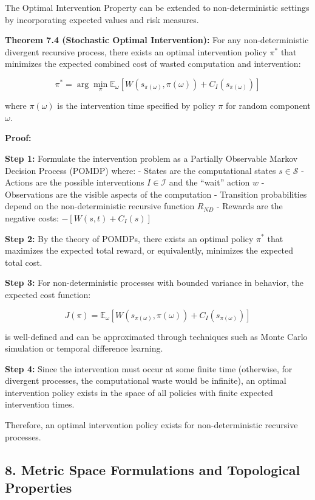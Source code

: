 \documentclass[
]{article}
\begin{document}
The Optimal Intervention Property can be extended to non-deterministic
settings by incorporating expected values and risk measures.

\textbf{Theorem 7.4 (Stochastic Optimal Intervention):} For any
non-deterministic divergent recursive process, there exists an optimal
intervention policy \(\pi^*\) that minimizes the expected combined cost
of wasted computation and intervention:

\[\pi^* = \arg\min_{\pi} \mathbb{E}_{\omega}[W(s_{\pi(\omega)}, \pi(\omega)) + C_I(s_{\pi(\omega)})]\]

where \(\pi(\omega)\) is the intervention time specified by policy
\(\pi\) for random component \(\omega\).

\textbf{Proof:}

\textbf{Step 1:} Formulate the intervention problem as a Partially
Observable Markov Decision Process (POMDP) where: - States are the
computational states \(s \in \mathcal{S}\) - Actions are the possible
interventions \(I \in \mathcal{I}\) and the ``wait'' action \(w\) -
Observations are the visible aspects of the computation - Transition
probabilities depend on the non-deterministic recursive function
\(R_{ND}\) - Rewards are the negative costs: \(-[W(s, t) + C_I(s)]\)

\textbf{Step 2:} By the theory of POMDPs, there exists an optimal policy
\(\pi^*\) that maximizes the expected total reward, or equivalently,
minimizes the expected total cost.

\textbf{Step 3:} For non-deterministic processes with bounded variance
in behavior, the expected cost function:

\[J(\pi) = \mathbb{E}_{\omega}[W(s_{\pi(\omega)}, \pi(\omega)) + C_I(s_{\pi(\omega)})]\]

is well-defined and can be approximated through techniques such as Monte
Carlo simulation or temporal difference learning.

\textbf{Step 4:} Since the intervention must occur at some finite time
(otherwise, for divergent processes, the computational waste would be
infinite), an optimal intervention policy exists in the space of all
policies with finite expected intervention times.

Therefore, an optimal intervention policy exists for non-deterministic
recursive processes.

\subsection{8. Metric Space Formulations and Topological
Properties}\label{metric-space-formulations-and-topological-properties}
\end{document}
